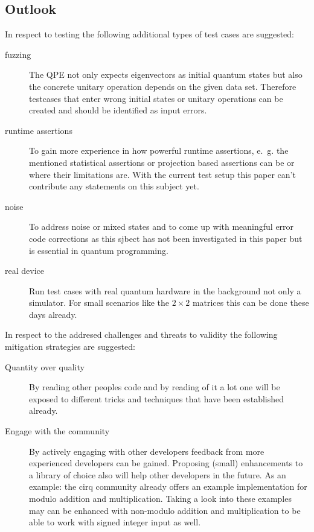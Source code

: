 \subsection{Outlook}
\label{subsec:outlook}
In respect to testing the following additional types of test cases are suggested:
\begin{description}
  \item [fuzzing] The QPE not only expects eigenvectors as initial quantum states but also the concrete unitary operation depends on the given data set. Therefore testcases that enter wrong initial states or unitary operations can be created and should be identified as input errors.
  \item [runtime assertions] To gain more experience in how powerful runtime assertions, e.~g. the mentioned statistical assertions or projection based assertions can be or where their limitations are. With the current test setup this paper can't contribute any statements on this subject yet.
  \item [noise] To address noise or mixed states and to come up with meaningful error code corrections as this sjbect has not been investigated in this paper but is essential in quantum programming.
  \item [real device] Run test cases with real quantum hardware in the background not only a simulator. For small scenarios like the $2 \times 2$ matrices this can be done these days already.
\end{description}

In respect to the addresed challenges and threats to validity the following mitigation strategies are suggested:
\begin{description}
  \item [Quantity over quality] By reading other peoples code and by reading of it a lot one will be exposed to different tricks and techniques that have been established already.
  \item [Engage with the community] By actively engaging with other developers feedback from more experienced developers can be gained. Proposing (small) enhancements to a library of choice also will help other developers in the future. As an example: the cirq community already offers an example implementation for modulo addition and multiplication. Taking a look into \cite{Sahin_2020} these examples may can be enhanced with non-modulo addition and multiplication to be able to work with signed integer input as well.
\end{description}
